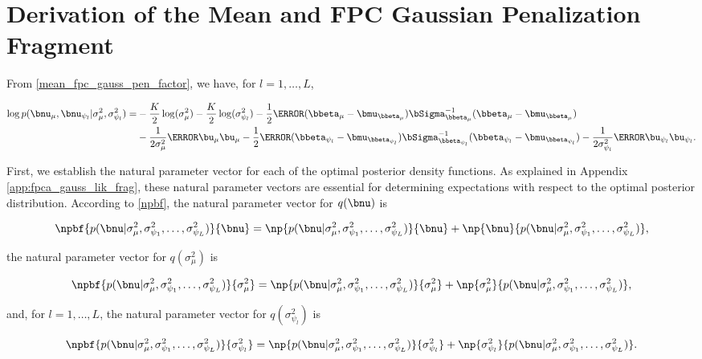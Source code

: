 \documentclass[12pt]{article}
\def\sigsqmu{\sigma^2_{\mu}}
\def\betamu{\bbeta_\mu}
\def\umu{\bu_\mu}
\def\numu{\bnu_\mu}
\newcommand\betapsi[1]{\bbeta_{\psi_{#1}}}
\newcommand\upsi[1]{\bu_{\psi_{#1}}}
\newcommand\nupsi[1]{\bnu_{\psi_{#1}}}
\newcommand\sigsqpsi[1]{\sigma^2_{\psi_{#1}}}
\theoremstyle{plain}
\theoremstyle{definition}
\theoremstyle{remark}
\begin{document}
\section{Derivation of the Mean and FPC Gaussian Penalization Fragment}
\label{app:mean_fpc_gauss_pen_frag}

From \eqref{mean_fpc_gauss_pen_factor}, we have, for $l = 1, \dots, L$,

\begin{align}
\begin{split}
	\log p (\numu, \nupsi{l} | \sigsqmu, \sigsqpsi{l}) =
		& -\frac{K}{2} \log (\sigsqmu) - \frac{K}{2} \log (\sigsqpsi{l})
			- \frac12 \T{(\betamu - \bmu_{\betamu})} \bSigma_{\betamu}^{-1} (\betamu - \bmu_{\betamu}) \\
		& - \frac{1}{2 \sigsqmu} \T{\umu} \umu
			- \frac12 \T{(\betapsi{l} - \bmu_{\betapsi{l}})} \bSigma_{\betapsi{l}}^{-1} (\betapsi{l} - \bmu_{\betapsi{l}})
			- \frac{1}{2 \sigsqpsi{l}} \T{\upsi{l}} \upsi{l}.
\end{split}
\label{log_mean_fpc_gauss_pen_factor}
\end{align}

First, we establish the natural parameter vector for each of the optimal posterior density functions. As explained
in Appendix \ref{app:fpca_gauss_lik_frag}, these natural
parameter vectors are essential for determining expectations with respect to the optimal posterior distribution.
According to \eqref{npbf}, the natural parameter vector for $q (\bnu)$ is

\[
	\npbf{p(\bnu | \sigsqmu, \sigsqpsi{1}, \dots, \sigsqpsi{L})}{\bnu} =
		\np{p(\bnu | \sigsqmu, \sigsqpsi{1}, \dots, \sigsqpsi{L})}{\bnu}
		+ \np{\bnu}{p(\bnu | \sigsqmu, \sigsqpsi{1}, \dots, \sigsqpsi{L})},
\]

\noindent the natural parameter vector for $q (\sigsqmu)$ is

\[
	\npbf{p(\bnu | \sigsqmu, \sigsqpsi{1}, \dots, \sigsqpsi{L})}{\sigsqmu} =
		\np{p(\bnu | \sigsqmu, \sigsqpsi{1}, \dots, \sigsqpsi{L})}{\sigsqmu}
		+ \np{\sigsqmu}{p(\bnu | \sigsqmu, \sigsqpsi{1}, \dots, \sigsqpsi{L})},
\]

\noindent and, for $l = 1, \dots, L$, the natural parameter vector for $q(\sigsqpsi{l})$ is

\[
	\npbf{p(\bnu | \sigsqmu, \sigsqpsi{1}, \dots, \sigsqpsi{L})}{\sigsqpsi{l}} =
		\np{p(\bnu | \sigsqmu, \sigsqpsi{1}, \dots, \sigsqpsi{L})}{\sigsqpsi{l}}
		+ \np{\sigsqpsi{l}}{p(\bnu | \sigsqmu, \sigsqpsi{1}, \dots, \sigsqpsi{L})}.
\]
\end{document}
